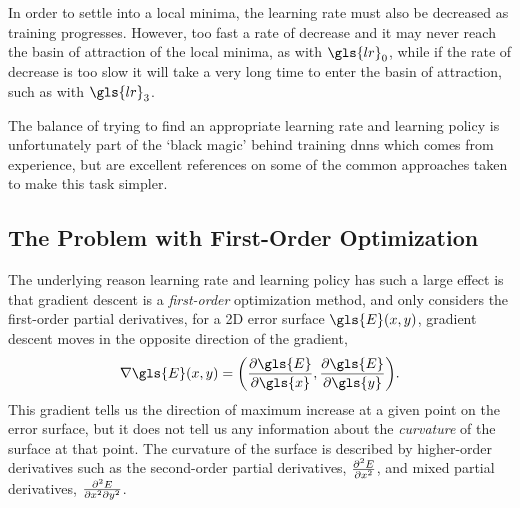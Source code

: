 \documentclass[thesis]{subfiles}
\begin{document}
In order to settle into a local minima, the learning rate must also be decreased as training progresses. However, too fast a rate of decrease and it may never reach the basin of attraction of the local minima, as with $\gls{lr}_0$, while if the rate of decrease is too slow it will take a very long time to enter the basin of attraction, such as with $\gls{lr}_3$. 

The balance of trying to find an appropriate learning rate and learning policy is unfortunately part of the `black magic' behind training \glspl{dnn} which comes from experience, but \citet{Bottou2012sgdtricks, goodfellow2016deep} are excellent references on some of the common approaches taken to make this task simpler.

\subsection{The Problem with First-Order Optimization}\label{pathological}
The underlying reason learning rate and learning policy has such a large effect is that gradient descent is a \emph{first-order} optimization method, and only considers the first-order partial derivatives, \ie for a 2D error surface $\gls{E}(x, y)$, gradient descent moves in the opposite direction of the gradient,
\begin{equation}
    \nabla \gls{E}(x, y) = {\left(\frac{\partial \gls{E}}{\partial \gls{x}}, \frac{\partial \gls{E}}{\partial \gls{y}}\right)}.
\end{equation}
This gradient tells us the direction of maximum increase at a given point on the error surface, but it does not tell us any information about the \emph{curvature} of the surface at that point. The curvature of the surface is described by higher-order derivatives such as the second-order partial derivatives, \eg
	$\pd[2]{E}{x}$,
and mixed partial derivatives, \eg
	$\md{E}{2}{x}{2}{y}{2}$.
%
\end{document}
